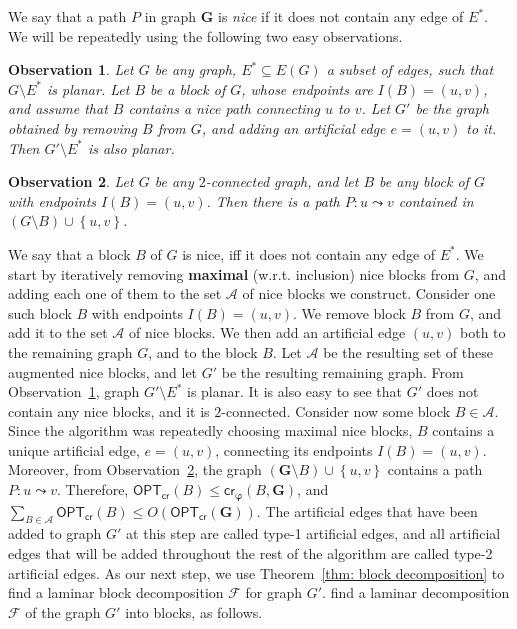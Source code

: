 \documentclass[twoside,leqno,twocolumn]{article}
\newcommand{\connect}{\leadsto}
\newcommand{\set}[1]{\left\{ #1 \right\}}
\newcommand{\sse}{\subseteq}
\newcommand{\aset}{{\mathcal{A}}}
\newcommand{\fset}{{\mathcal{F}}}
\newtheorem{observation}{Observation}[section]
\newtheorem{observation}{Observation}
\newcommand{\optcro}[1]{\mathsf{OPT}_{\mathsf{cr}}(#1)}
\newcommand{\cro}{\mathsf{cr}}
\newcommand{\G}{{\mathbf{G}}}
\newcommand{\bphi}{{\boldsymbol{\varphi}}}
\begin{document}
We say that a path $P$ in graph $\G$ is \emph{nice} if it does not contain any edge of $E^*$. We will be repeatedly using the following two easy observations.

\begin{observation}\label{observation: remains planar}
Let $G$ be any graph, $E^*\sse E(G)$ a subset of edges, such that $G\setminus E^*$ is planar. Let $B$ be a block of $G$, whose endpoints are $I(B)=(u,v)$, and assume that $B$ contains a nice path connecting $u$ to $v$. Let $G'$ be the graph obtained by removing $B$ from $G$, and adding an artificial edge $e=(u,v)$ to it. Then $G'\setminus E^*$ is also planar.
\end{observation}

\begin{observation}\label{observation: path}
Let $G$ be any $2$-connected graph, and let $B$ be any block of $G$ with endpoints $I(B)=(u,v)$. Then there is a path $P:u\connect v$ contained in $(G\setminus B)\cup\set{u,v}$.
\end{observation}

We say that a block $B$ of $G$ is nice, iff it does not contain any edge of $E^*$. We start by iteratively removing {\bf maximal} (w.r.t. inclusion) nice blocks from $G$, and adding each one of them to the set $\aset$ of nice blocks we construct. 
Consider one such block $B$ with endpoints $I(B)=(u,v)$. We remove block $B$ from $G$, and add it to the set $\aset$ of nice blocks. We then add an artificial edge $(u,v)$ both to the remaining graph $G$, and to the block $B$. Let $\aset$ be the resulting set of these augmented nice blocks, and let $G'$ be the resulting remaining graph. From Observation~\ref{observation: remains planar}, graph $G'\setminus E^*$ is planar. It is also easy to see that $G'$ does not contain any nice blocks, and it is $2$-connected.
Consider now some block $B\in \aset$. Since the algorithm was repeatedly choosing maximal nice blocks, $B$ contains a unique artificial edge, $e=(u,v)$, connecting its endpoints $I(B)=(u,v)$. Moreover, from Observation~\ref{observation: path}, the graph $(\G\setminus B)\cup\set{u,v}$ contains a path $P:u\connect v$. Therefore, $\optcro{B}\leq \cro_{\bphi}(B, \G)$, and $\sum_{B\in \aset} \optcro{B}\leq O(\optcro{\G})$. The artificial edges that have been added to graph $G'$ at this step are called type-1 artificial edges, and all artificial edges that will be added throughout the rest of the algorithm are called type-2 artificial edges.
As our next step, we use Theorem~\ref{thm: block decomposition} to find a laminar block decomposition $\fset$ for graph $G'$.
\iffalse
find a laminar decomposition $\fset$ of the graph $G'$ into blocks, as follows. 
\end{document}
